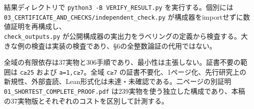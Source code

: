 \documentclass[
  10pt,
  a4paper,
]{article}
\let\originaltexttt\texttt
\renewcommand{\texttt}[1]{\leavevmode\allowbreak\mbox{\originaltexttt{#1}}}
\begin{document}
結果ディレクトリで \texttt{python3\ -B\ VERIFY\_RESULT.py}
を実行する。個別には\\
\texttt{03\_CERTIFICATE\_AND\_CHECKS/independent\_check.py}
が構成器をimportせずに数値証明を再構成し、\\
\texttt{check\_outputs.py}
が公開構成器の実出力をラベリングの定義から検査する。大きな例の検査は実装の検査であり、§6の全整数論証の代用ではない。

全域の有限依存は37実物と306手順であり、最小性は主張しない。証書不要の範囲は
\texttt{c≥25} および \texttt{a=1,c≥7}。全域 \texttt{c≥7}
の証書不要化、1ページ化、先行研究上の新規性、外部査読、Lean形式化は未達・未確認である。二ページの別証明
\texttt{01\_SHORTEST\_COMPLETE\_PROOF.pdf}
は239実物を使う独立した構成であり、本稿の37実物版とそれぞれのコストを区別して計測する。
\end{document}
